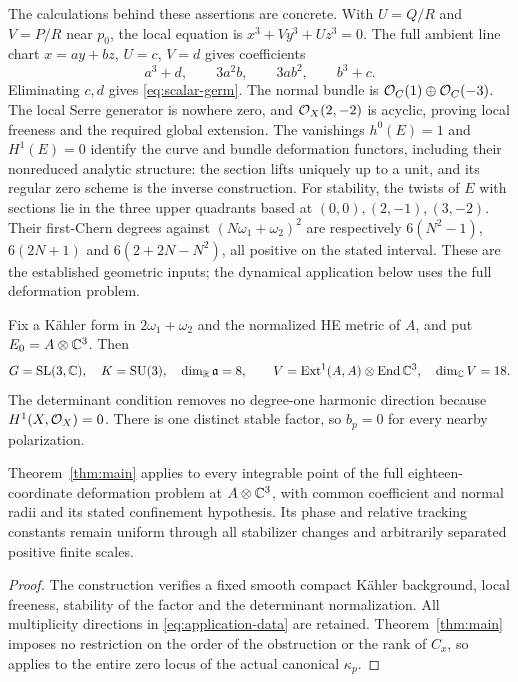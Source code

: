 The calculations behind these assertions are concrete.
With $U=Q/R$ and $V=P/R$ near $p_0$, the local equation
is $x^3+Vy^3+Uz^3=0$. The full ambient line chart
$x=ay+bz$, $U=c$, $V=d$ gives coefficients
\[
 a^3+d,\qquad 3a^2b,\qquad 3ab^2,\qquad b^3+c.
\]
Eliminating $c,d$ gives \eqref{eq:scalar-germ}.
The normal bundle is $\mathcal O_C(1)\oplus\mathcal O_C(-3)$.
The local Serre generator is nowhere zero, and
$\mathcal O_X(2,-2)$ is acyclic, proving local freeness
and the required global extension. The vanishings
$h^0(E)=1$ and $H^1(E)=0$ identify the curve and
bundle deformation functors, including their
nonreduced analytic structure: the section lifts
uniquely up to a unit, and its regular zero scheme
is the inverse construction. For stability, the
twists of $E$ with sections lie in the three upper
quadrants based at $(0,0),(2,-1),(3,-2)$.
Their first-Chern degrees against
$(N\omega_1+\omega_2)^2$ are respectively
$6(N^2-1)$, $6(2N+1)$ and $6(2+2N-N^2)$,
all positive on the stated interval.
These are the established geometric inputs;
the dynamical application below uses the full
deformation problem.

Fix a K\"ahler form in $2\omega_1+\omega_2$ and
the normalized HE metric of $A$, and put
$E_0=A\otimes\mathbb C^3$. Then
\begin{equation}\label{eq:application-data}
 G=\mathrm{SL}(3,\mathbb C),\quad K=\mathrm{SU}(3),\quad
 \dim_{\mathbb R}\mathfrak a=8,\qquad
 V=\operatorname{Ext}^1(A,A)\otimes\operatorname{End}\mathbb C^3,\quad \dim_{\mathbb C}V=18.
\end{equation}
The determinant condition removes no degree-one
harmonic direction because $H^1(X,\mathcal O_X)=0$.
There is one distinct stable factor, so $b_p=0$
for every nearby polarization.

\begin{corollary}\label{cor:bicubic}
Theorem~\ref{thm:main} applies to every integrable
point of the full eighteen-coordinate deformation
problem at $A\otimes\mathbb C^3$, with common coefficient
and normal radii and its stated confinement hypothesis.
Its phase and relative tracking constants remain
uniform through all stabilizer changes and arbitrarily
separated positive finite scales.
\end{corollary}

\begin{proof}
The construction verifies a fixed smooth compact
K\"ahler background, local freeness, stability of
the factor and the determinant normalization.
All multiplicity directions in \eqref{eq:application-data}
are retained. Theorem~\ref{thm:main} imposes no
restriction on the order of the obstruction or
the rank of $C_x$, so applies to the entire zero
locus of the actual canonical $\kappa_p$.
\end{proof}

